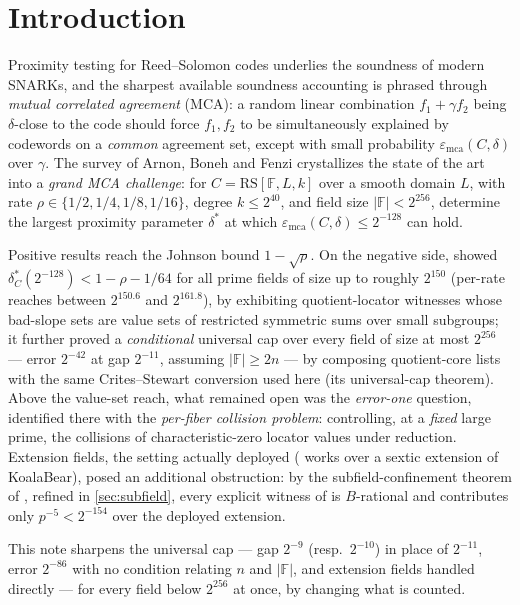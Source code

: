 \documentclass[11pt]{article}
\theoremstyle{definition}
\theoremstyle{remark}
\newcommand{\F}{\mathbb{F}}
\newcommand{\B}{B}
\newcommand{\RS}{\mathrm{RS}}
\newcommand{\emca}{\varepsilon_{\mathrm{mca}}}
\begin{document}
\section{Introduction}\label{sec:intro}

Proximity testing for Reed--Solomon codes underlies the soundness of modern SNARKs, and the sharpest available soundness accounting is phrased through \emph{mutual correlated agreement} (MCA): a random linear combination $f_1+\gamma f_2$ being $\delta$-close to the code should force $f_1,f_2$ to be simultaneously explained by codewords on a \emph{common} agreement set, except with small probability $\emca(C,\delta)$ over $\gamma$. The survey of Arnon, Boneh and Fenzi \cite{ABF26} crystallizes the state of the art into a \emph{grand MCA challenge}: for $C=\RS[\F,L,k]$ over a smooth domain $L$, with rate $\rho\in\{1/2,1/4,1/8,1/16\}$, degree $k\le2^{40}$, and field size $|\F|<2^{256}$, determine the largest proximity parameter $\delta^*$ at which $\emca(C,\delta)\le2^{-128}$ can hold.

Positive results reach the Johnson bound $1-\sqrt\rho$. On the negative side, \cite{Cho26b} showed $\delta^*_C(2^{-128})<1-\rho-1/64$ for all prime fields of size up to roughly $2^{150}$ (per-rate reaches between $2^{150.6}$ and $2^{161.8}$), by exhibiting quotient-locator witnesses whose bad-slope sets are value sets of restricted symmetric sums over small subgroups; it further proved a \emph{conditional} universal cap over every field of size at most $2^{256}$ --- error $2^{-42}$ at gap $2^{-11}$, assuming $|\F|\ge2n$ --- by composing quotient-core lists with the same Crites--Stewart conversion used here (its universal-cap theorem). Above the value-set reach, what remained open was the \emph{error-one} question, identified there with the \emph{per-fiber collision problem}: controlling, at a \emph{fixed} large prime, the collisions of characteristic-zero locator values under reduction. Extension fields, the setting actually deployed (\cite[\S6.3]{ABF26} works over a sextic extension of KoalaBear), posed an additional obstruction: by the subfield-confinement theorem of \cite{Cho26b}, refined in \cref{sec:subfield}, every explicit witness of \cite{Cho26a,Cho26b} is $\B$-rational and contributes only $p^{-5}<2^{-154}$ over the deployed extension.

This note sharpens the universal cap --- gap $2^{-9}$ (resp.\ $2^{-10}$) in place of $2^{-11}$, error $2^{-86}$ with no condition relating $n$ and $|\F|$, and extension fields handled directly --- for every field below $2^{256}$ at once, by changing what is counted.
\end{document}
